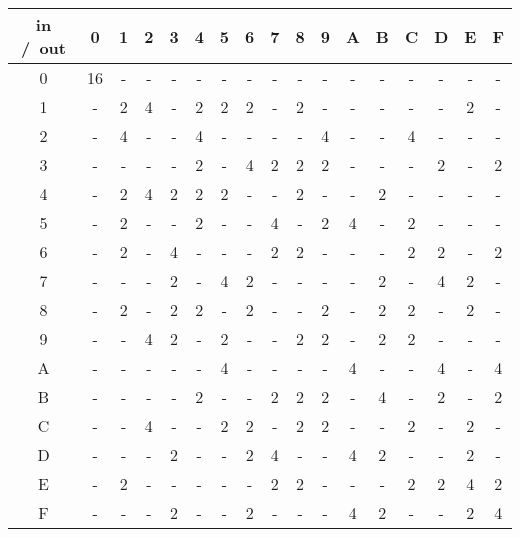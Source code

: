 
\begin{tabular}{c|cccccccccccccccc}
in /\ out & 0 & 1 & 2 & 3 & 4 & 5 & 6 & 7 & 8 & 9 & A & B & C & D & E & F \\
\hline
0 & 16 & - & - & - & - & - & - & - & - & - & - & - & - & - & - & - \\
1 & - & 2 & 4 & - & 2 & 2 & 2 & - & 2 & - & - & - & - & - & 2 & - \\
2 & - & 4 & - & - & 4 & - & - & - & - & 4 & - & - & 4 & - & - & - \\
3 & - & - & - & - & 2 & - & 4 & 2 & 2 & 2 & - & - & - & 2 & - & 2 \\
4 & - & 2 & 4 & 2 & 2 & 2 & - & - & 2 & - & - & 2 & - & - & - & - \\
5 & - & 2 & - & - & 2 & - & - & 4 & - & 2 & 4 & - & 2 & - & - & - \\
6 & - & 2 & - & 4 & - & - & - & 2 & 2 & - & - & - & 2 & 2 & - & 2 \\
7 & - & - & - & 2 & - & 4 & 2 & - & - & - & - & 2 & - & 4 & 2 & - \\
8 & - & 2 & - & 2 & 2 & - & 2 & - & - & 2 & - & 2 & 2 & - & 2 & - \\
9 & - & - & 4 & 2 & - & 2 & - & - & 2 & 2 & - & 2 & 2 & - & - & - \\
A & - & - & - & - & - & 4 & - & - & - & - & 4 & - & - & 4 & - & 4 \\
B & - & - & - & - & 2 & - & - & 2 & 2 & 2 & - & 4 & - & 2 & - & 2 \\
C & - & - & 4 & - & - & 2 & 2 & - & 2 & 2 & - & - & 2 & - & 2 & - \\
D & - & - & - & 2 & - & - & 2 & 4 & - & - & 4 & 2 & - & - & 2 & - \\
E & - & 2 & - & - & - & - & - & 2 & 2 & - & - & - & 2 & 2 & 4 & 2 \\
F & - & - & - & 2 & - & - & 2 & - & - & - & 4 & 2 & - & - & 2 & 4 \\
\end{tabular}
